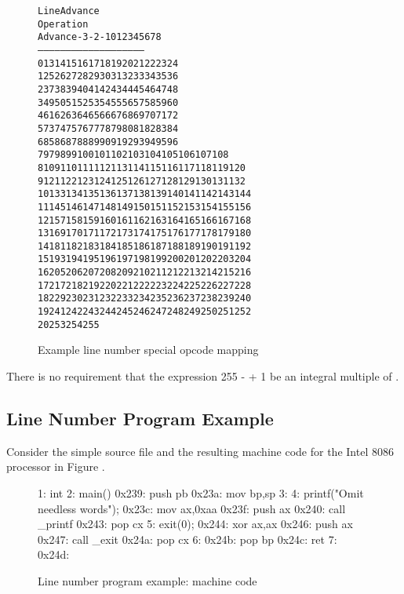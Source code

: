 \begin{figure}[ht]
\begin{alltt}
                        Line Advance
   Operation  
     Advance    -3  -2  -1   0   1   2   3   4   5   6   7   8
   ---------   -----------------------------------------------
           0    13  14  15  16  17  18  19  20  21  22  23  24
           1    25  26  27  28  29  30  31  32  33  34  35  36
           2    37  38  39  40  41  42  43  44  45  46  47  48
           3    49  50  51  52  53  54  55  56  57  58  59  60
           4    61  62  63  64  65  66  67  68  69  70  71  72
           5    73  74  75  76  77  78  79  80  81  82  83  84
           6    85  86  87  88  89  90  91  92  93  94  95  96
           7    97  98  99 100 101 102 103 104 105 106 107 108
           8   109 110 111 112 113 114 115 116 117 118 119 120
           9   121 122 123 124 125 126 127 128 129 130 131 132
          10   133 134 135 136 137 138 139 140 141 142 143 144
          11   145 146 147 148 149 150 151 152 153 154 155 156
          12   157 158 159 160 161 162 163 164 165 166 167 168
          13   169 170 171 172 173 174 175 176 177 178 179 180
          14   181 182 183 184 185 186 187 188 189 190 191 192
          15   193 194 195 196 197 198 199 200 201 202 203 204
          16   205 206 207 208 209 210 211 212 213 214 215 216
          17   217 218 219 220 221 222 223 224 225 226 227 228 
          18   229 230 231 232 233 234 235 236 237 238 239 240 
          19   241 242 243 244 245 246 247 248 249 250 251 252
          20   253 254 255
          
\end{alltt}
\caption{Example line number special opcode mapping}
\label{fig:examplelinenumberspecialopcodemapping}
\end{figure}

There is no requirement that the expression 
255 -  + 1 be an integral multiple of
.


\clearpage
\subsection{Line Number Program Example}
\label{app:linenumberprogramexample}

Consider the simple source file and the resulting machine
code for the Intel 8086 processor in 
Figure .

\begin{figure}[ht]
\begin{nlnlisting}
1: int
2: main()
    0x239: push pb
    0x23a: mov bp,sp
3: {
4: printf("Omit needless words\n");
    0x23c: mov ax,0xaa
    0x23f: push ax
    0x240: call _printf
    0x243: pop cx
5: exit(0);
    0x244: xor ax,ax
    0x246: push ax
    0x247: call _exit
    0x24a: pop cx
6: }
    0x24b: pop bp
    0x24c: ret
7: 0x24d:
\end{nlnlisting}
\caption{Line number program example: machine code}
\label{fig:linenumberprogramexamplemachinecode}
\end{figure}

